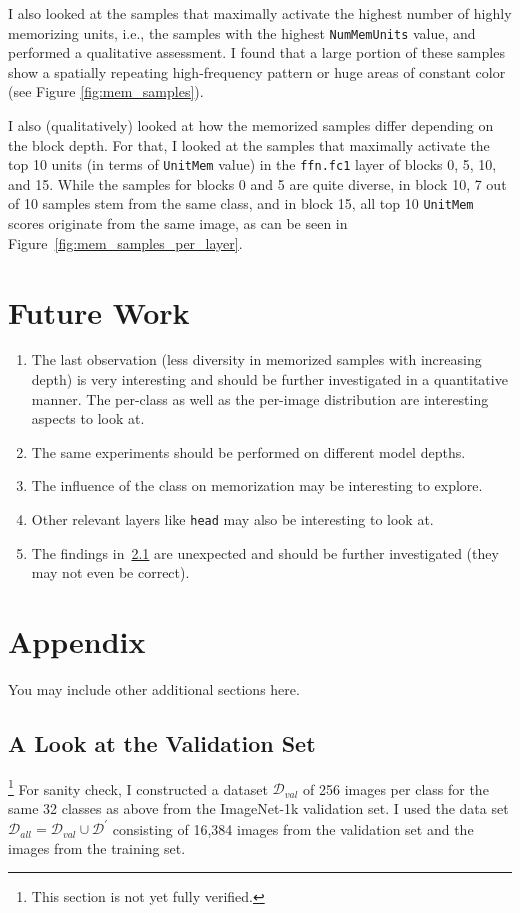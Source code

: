 \documentclass{article} %
\begin{document}
I also looked at the samples that maximally activate the highest number of highly memorizing units, i.e., the samples with the highest \texttt{NumMemUnits} value, and performed a qualitative assessment.
I found that a large portion of these samples show a spatially repeating high-frequency pattern or huge areas of constant color (see Figure \ref{fig:mem_samples}).

I also (qualitatively) looked at how the memorized samples differ depending on the block depth.
For that, I looked at the samples that maximally activate the top 10 units (in terms of \texttt{UnitMem} value) in the \texttt{ffn.fc1} layer of blocks 0, 5, 10, and 15.
While the samples for blocks 0 and 5 are quite diverse, in block 10, 7 out of 10 samples stem from the same class, and in block 15, all top 10 \texttt{UnitMem} scores originate from the same image, as can be seen in Figure~\ref{fig:mem_samples_per_layer}.

\section{Future Work}
\begin{enumerate}
   \item The last observation (less diversity in memorized samples with increasing depth) is very interesting and should be further investigated in a quantitative manner.
   The per-class as well as the per-image distribution are interesting aspects to look at.
   \item The same experiments should be performed on different model depths.
   \item The influence of the class on memorization may be interesting to explore.
   \item Other relevant layers like \texttt{head} may also be interesting to look at.
   \item The findings in~\ref{look_at_val} are unexpected and should be further investigated (they may not even be correct).
\end{enumerate}






\newpage
\appendix
\section{Appendix}
You may include other additional sections here.
\subsection{A Look at the Validation Set}\label{look_at_val}\footnote{This section is not yet fully verified.}
For sanity check, I constructed a dataset $\mathcal{D}_{val}$ of 256 images per class for the same 32 classes as above from the ImageNet-1k validation set.
I used the data set $\mathcal{D}_{all} = \mathcal{D}_{val} \cup \mathcal{D}^\prime$ consisting of 16,384 images from the validation set and the images from the training set.
\end{document}
